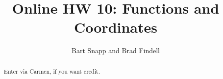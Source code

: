 \documentclass[handout,space,nooutcomes]{xourse}
\title{Online HW 10: Functions and Coordinates}
\author{Bart Snapp and Brad Findell}
\begin{document}
\begin{abstract}
Enter via Carmen, if you want credit.  
\end{abstract}
\maketitle

{}
%
%
\end{document}
